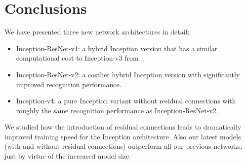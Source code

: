 \section{Conclusions}

We have presented three new network architectures in detail:

\begin{itemize}
  \item Inception-ResNet-v1: a hybrid Inception version that has a
    similar computational cost to Inception-v3
    from~\cite{szegedy2015rethinking}.
  \item Inception-ResNet-v2: a costlier hybrid Inception version with
    significantly improved recognition performance.
  \item Inception-v4: a pure Inception variant without residual connections
    with roughly the same recognition performance as Inception-ResNet-v2.
\end{itemize}

We studied how the introduction of residual connections leads to dramatically
improved training speed for the Inception architecture. Also our latest models
(with and without residual connections) outperform all our previous networks,
just by virtue of the increased model size.
